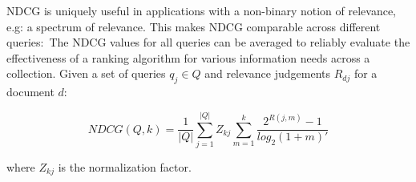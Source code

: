 NDCG is uniquely useful in applications with a non-binary notion of relevance, e.g: a spectrum of relevance.
This makes NDCG comparable across different queries:\
The NDCG values for all queries can be averaged to reliably evaluate the effectiveness of a ranking algorithm for various information needs across a collection.
Given a set of queries $ q_j \in Q $ and relevance judgements $ R_{dj} $ for a document $ d $:\

\begin{equation}
NDCG(Q, k) = \frac{1}{|Q|} \sum ^{|Q|} _{j = 1} Z_{kj} \sum ^k _{m = 1} \frac{2^{R(j, m)} - 1}{log_2 (1 + m)'}
\end{equation}

where $ Z_{kj} $ is the normalization factor.